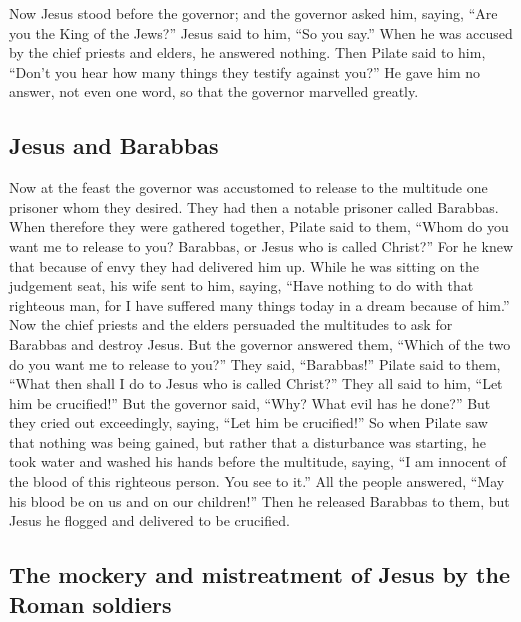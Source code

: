  Now Jesus stood before the governor; and the governor
asked him, saying, ``Are you the King of the Jews?'' Jesus said to him,
``So you say.''  When he was accused by the chief priests
and elders, he answered nothing.  Then Pilate said to
him, ``Don't you hear how many things they testify against you?''
 He gave him no answer, not even one word, so that the
governor marvelled greatly.

\hypertarget{jesus-and-barabbas}{%
\subsection{Jesus and Barabbas}\label{jesus-and-barabbas}}

 Now at the feast the governor was accustomed to release
to the multitude one prisoner whom they desired.  They
had then a notable prisoner called Barabbas.  When
therefore they were gathered together, Pilate said to them, ``Whom do
you want me to release to you? Barabbas, or Jesus who is called
Christ?''  For he knew that because of envy they had
delivered him up.  While he was sitting on the judgement
seat, his wife sent to him, saying, ``Have nothing to do with that
righteous man, for I have suffered many things today in a dream because
of him.''  Now the chief priests and the elders persuaded
the multitudes to ask for Barabbas and destroy Jesus. 
But the governor answered them, ``Which of the two do you want me to
release to you?'' They said, ``Barabbas!''  Pilate said
to them, ``What then shall I do to Jesus who is called Christ?'' They
all said to him, ``Let him be crucified!''  But the
governor said, ``Why? What evil has he done?'' But they cried out
exceedingly, saying, ``Let him be crucified!''  So when
Pilate saw that nothing was being gained, but rather that a disturbance
was starting, he took water and washed his hands before the multitude,
saying, ``I am innocent of the blood of this righteous person. You see
to it.''  All the people answered, ``May his blood be on
us and on our children!''  Then he released Barabbas to
them, but Jesus he flogged and delivered to be crucified.

\hypertarget{the-mockery-and-mistreatment-of-jesus-by-the-roman-soldiers}{%
\subsection{The mockery and mistreatment of Jesus by the Roman
soldiers}\label{the-mockery-and-mistreatment-of-jesus-by-the-roman-soldiers}}

